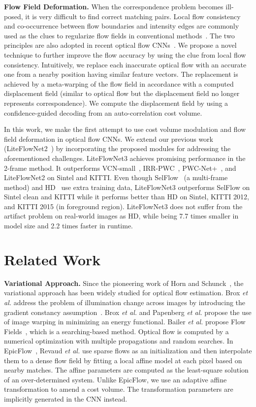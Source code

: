 \documentclass[runningheads]{llncs}
\newcommand{\etal}{\emph{et al. }}
\begin{document}
\noindent\textbf{Flow Field Deformation.} When the correspondence problem becomes ill-posed, it is very difficult to find correct matching pairs. Local flow consistency and co-occurrence between flow boundaries and intensity edges are commonly used as the clues to regularize flow fields in conventional methods~\cite{Werlberger09,Zimmer11}. The two principles are also adopted in recent optical flow CNNs~\cite{Hui18,Hui20,Hur19}.
We propose a novel technique to further improve the flow accuracy by using the clue from local flow consistency. Intuitively, we replace each inaccurate optical flow with an accurate one from a nearby position having similar feature vectors. The replacement is achieved by a meta-warping of the flow field in accordance with a computed displacement field (similar to optical flow but the displacement field no longer represents correspondence). We compute the displacement field by using a confidence-guided decoding from an auto-correlation cost volume. 

In this work, we make the first attempt to use cost volume modulation and flow field deformation in optical flow CNNs.
We extend our previous work (LiteFlowNet2~\cite{Hui20}) by incorporating the proposed modules for addressing the aforementioned challenges. 
LiteFlowNet3 achieves promising performance in the 2-frame method. It outperforms VCN-small~\cite{Yang19}, IRR-PWC~\cite{Hur19}, PWC-Net+~\cite{Sun19}, and LiteFlowNet2 on Sintel and KITTI.
Even though SelFlow~\cite{Liu19} (a multi-frame method) and HD~\cite{Yin19} use extra training data, LiteFlowNet3 outperforms SelFlow on Sintel clean and KITTI while it performs better than HD on Sintel, KITTI 2012, and KITTI 2015 (in foreground region). 
LiteFlowNet3 does not suffer from the artifact problem on real-world images as HD, while being 7.7 times smaller in model size and 2.2 times faster in runtime. 

\section{Related Work}
\noindent\textbf{Variational Approach.} Since the pioneering work of Horn and Schunck~\cite{Horn81}, the variational approach has been widely studied for optical flow estimation. Brox \etal address the problem of illumination change across images by introducing the gradient constancy assumption~\cite{Brox04}. Brox \etal \cite{Brox04} and Papenberg \etal \cite{Papenberg06} propose the use of image warping in minimizing an energy functional. Bailer \etal propose Flow Fields~\cite{Bailer15}, which is a searching-based method. Optical flow is computed by a numerical optimization with multiple propagations and random searches. In EpicFlow~\cite{Revaud15}, Revaud \etal use sparse flows as an initialization and then interpolate them to a dense flow field by fitting a local affine model at each pixel based on nearby matches. The affine parameters are computed as the least-square solution of an over-determined system. Unlike EpicFlow, we use an adaptive affine transformation to amend a cost volume. The transformation parameters are implicitly generated in the CNN instead.
\end{document}

